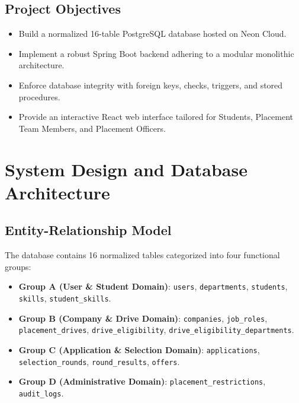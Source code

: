 \documentclass[12pt,a4paper]{report}
\begin{document}
\section{Project Objectives}
\begin{itemize}
    \item Build a normalized 16-table PostgreSQL database hosted on Neon Cloud.
    \item Implement a robust Spring Boot backend adhering to a modular monolithic architecture.
    \item Enforce database integrity with foreign keys, checks, triggers, and stored procedures.
    \item Provide an interactive React web interface tailored for Students, Placement Team Members, and Placement Officers.
\end{itemize}

\chapter{System Design and Database Architecture}

\section{Entity-Relationship Model}
The database contains 16 normalized tables categorized into four functional groups:
\begin{itemize}
    \item \textbf{Group A (User \& Student Domain)}: \texttt{users}, \texttt{departments}, \texttt{students}, \texttt{skills}, \texttt{student\_skills}.
    \item \textbf{Group B (Company \& Drive Domain)}: \texttt{companies}, \texttt{job\_roles}, \texttt{placement\_drives}, \texttt{drive\_eligibility}, \texttt{drive\_eligibility\_departments}.
    \item \textbf{Group C (Application \& Selection Domain)}: \texttt{applications}, \texttt{selection\_rounds}, \texttt{round\_results}, \texttt{offers}.
    \item \textbf{Group D (Administrative Domain)}: \texttt{placement\_restrictions}, \texttt{audit\_logs}.
\end{itemize}
\end{document}
